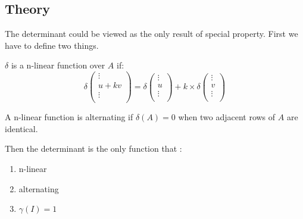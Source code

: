 \subsection{Theory}

The determinant could be viewed as the only result of special property. First we have to define two things.

\begin{definition}
    $\delta$ is a n-linear function over $A$ if:
    \begin{equation}
        \delta \begin{pmatrix}
            \vdots \\
            u + kv \\
            \vdots \\
        \end{pmatrix} = \delta \begin{pmatrix}
            \vdots \\
            u \\
            \vdots \\
        \end{pmatrix} + k \times \delta \begin{pmatrix}
            \vdots \\
            v \\
            \vdots \\
        \end{pmatrix} 
    \end{equation}
\end{definition}


\begin{definition}[alternating]
    A n-linear function is alternating if $\delta (A) = 0$ when two adjacent rows of $A$ are identical.
\end{definition}

Then the determinant is the only function that :
\begin{enumerate}
    \item n-linear
    \item alternating
    \item $\gamma(I) = 1$
\end{enumerate}

